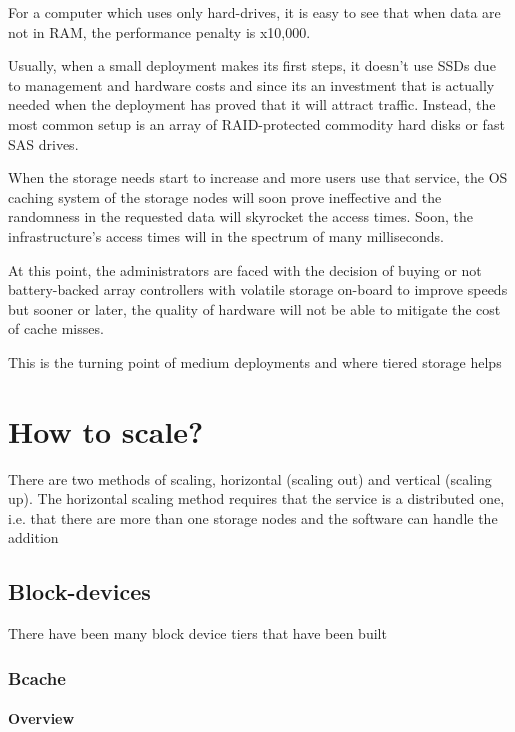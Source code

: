 For a computer which uses only hard-drives, it is easy to see that when data 
are not in RAM, the performance penalty is x10,000.

Usually, when a small deployment makes its first steps, it doesn't use SSDs due 
to management and hardware costs and since its an investment that is actually 
needed when the deployment has proved that it will attract traffic. Instead, 
the most common setup is an array of RAID-protected commodity hard disks or 
fast SAS drives.

When the storage needs start to increase and more users use that service, the 
OS caching system of the storage nodes will soon prove ineffective and the 
randomness in the requested data will skyrocket the access times. Soon, the 
infrastructure's access times will in the spectrum of many milliseconds.

At this point, the administrators are faced with the decision of buying or not 
battery-backed array controllers with volatile storage on-board to improve 
speeds but sooner or later, the quality of hardware will not be able to 
mitigate the cost of cache misses.

This is the turning point of medium deployments and where tiered storage helps


\section{How to scale?}

There are two methods of scaling, horizontal (scaling out) and vertical 
(scaling up). The horizontal scaling method requires that the service is a 
distributed one, i.e. that there are more than one storage nodes and the 
software can handle the addition 


\subsection{Block-devices}

There have been many block device tiers that have been built


\subsubsection{Bcache}

\paragraph{Overview}

